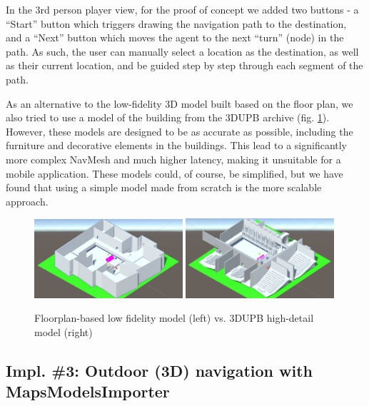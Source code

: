         In the 3rd person player view, for the proof of concept we added two buttons - a “Start” button which triggers drawing the navigation path to the destination, and a “Next” button which moves the agent to the next “turn” (node) in the path. As such, the user can manually select a location as the destination, as well as their current location, and be guided step by step through each segment of the path.
        
        As an alternative to the low-fidelity 3D model built based on the floor plan, we also tried to use a model of the building from the 3DUPB archive (fig. \ref{3:fig:ed_model}). However, these models are designed to be as accurate as possible, including the furniture and decorative elements in the buildings. This lead to a significantly more complex NavMesh and much higher latency, making it unsuitable for a mobile application. These models could, of course, be simplified, but we have found that using a simple model made from scratch is the more scalable approach.
            
        \begin{figure}[!ht]
            \centering
            \begin{minipage}[b]{\textwidth}
                \captionsetup{justification=centering}
                 \includegraphics[width=0.49\textwidth]{figures/demos/ec_model_simple.jpeg}
                 \includegraphics[width=0.49\textwidth]{figures/demos/ec_model_3dupb.jpeg}
                \caption{Floorplan-based low fidelity model (left) vs. 3DUPB high-detail model (right)}
                \label{3:fig:ed_model}
            \end{minipage}
        \end{figure}
    
    \subsection{Impl. \#3: Outdoor (3D) navigation with MapsModelsImporter} \label{3:impl3}
    
